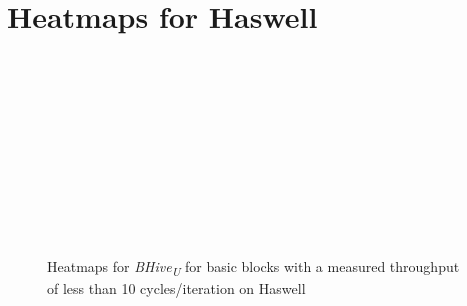 \documentclass[sigconf,nonacm]{acmart}
\newcommand{\bhiveu}{\emph{BHive\textsubscript{U}}\xspace}
\begin{document}
\section{Heatmaps for Haswell}
\vfill
\begin{figure}[H]
\centering
\begin{subfigure}[t]{0.33\textwidth}\end{subfigure}~
\begin{subfigure}[t]{0.33\textwidth}\end{subfigure}~
\begin{subfigure}[t]{0.33\textwidth}\end{subfigure}\par\bigskip

\begin{subfigure}[t]{0.33\textwidth}\end{subfigure}~
\begin{subfigure}[t]{0.33\textwidth}\end{subfigure}~
\begin{subfigure}[t]{0.33\textwidth}\end{subfigure}\par\bigskip

\begin{subfigure}[t]{0.33\textwidth}\end{subfigure}~
\begin{subfigure}[t]{0.33\textwidth}\end{subfigure}
~\begin{subfigure}[t]{0.33\textwidth}\end{subfigure}
\caption{Heatmaps for \bhiveu for basic blocks with a measured throughput of less than 10 cycles/iteration on Haswell}
\end{figure}
\vfill
\end{document}
